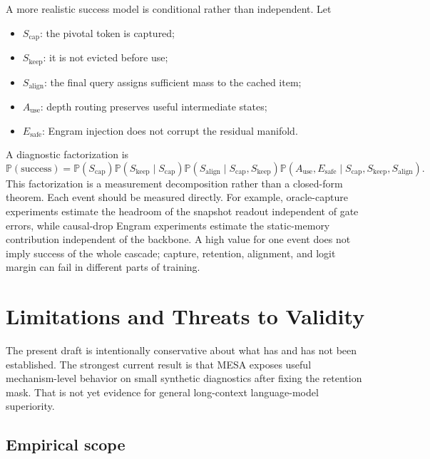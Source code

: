\documentclass[11pt]{article}
\newcommand{\Prob}{\mathbb{P}}
\begin{document}
A more realistic success model is conditional rather than independent. Let
\begin{itemize}
    \item $S_{\mathrm{cap}}$: the pivotal token is captured;
    \item $S_{\mathrm{keep}}$: it is not evicted before use;
    \item $S_{\mathrm{align}}$: the final query assigns sufficient mass to the cached item;
    \item $A_{\mathrm{use}}$: depth routing preserves useful intermediate states;
    \item $E_{\mathrm{safe}}$: Engram injection does not corrupt the residual manifold.
\end{itemize}
A diagnostic factorization is
\begin{equation}
\label{eq:cascade}
\Prob(\mathrm{success})
= \Prob(S_{\mathrm{cap}})
\Prob(S_{\mathrm{keep}}\mid S_{\mathrm{cap}})
\Prob(S_{\mathrm{align}}\mid S_{\mathrm{cap}},S_{\mathrm{keep}})
\Prob(A_{\mathrm{use}},E_{\mathrm{safe}}\mid S_{\mathrm{cap}},S_{\mathrm{keep}},S_{\mathrm{align}}).
\end{equation}
This factorization is a measurement decomposition rather than a closed-form theorem. Each event should be measured directly. For example, oracle-capture experiments estimate the headroom of the snapshot readout independent of gate errors, while causal-drop Engram experiments estimate the static-memory contribution independent of the backbone. A high value for one event does not imply success of the whole cascade; capture, retention, alignment, and logit margin can fail in different parts of training.

\section{Limitations and Threats to Validity}

The present draft is intentionally conservative about what has and has not been established. The strongest current result is that MESA exposes useful mechanism-level behavior on small synthetic diagnostics after fixing the retention mask. That is not yet evidence for general long-context language-model superiority.

\subsection{Empirical scope}
\end{document}
